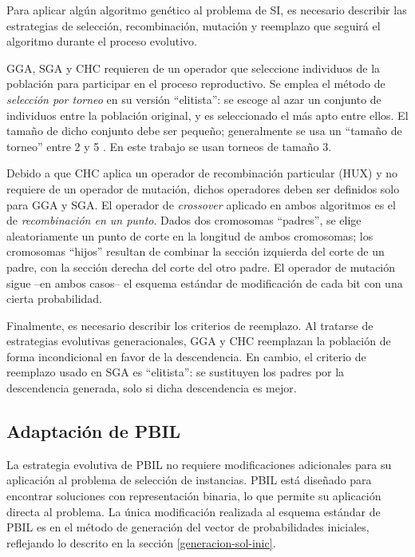 Para aplicar algún algoritmo genético al problema de SI, es necesario describir las estrategias de selección, recombinación, mutación y reemplazo que seguirá el algoritmo durante el proceso evolutivo.

GGA, SGA y CHC requieren de un operador que seleccione individuos de la población para participar en el proceso reproductivo. Se emplea el método de \emph{selección por torneo} en su versión ``elitista'': se escoge al azar un conjunto de individuos entre la población original, y es seleccionado el más apto entre ellos. El tamaño de dicho conjunto debe ser pequeño; generalmente se usa un ``tamaño de torneo'' entre 2 y 5 \cite{Miller95geneticalgorithms}. En este trabajo se usan torneos de tamaño 3.

Debido a que CHC aplica un operador de recombinación particular (HUX) y no requiere de un operador de mutación, dichos operadores deben ser definidos solo para GGA y SGA. El operador de \emph{crossover} aplicado en ambos algoritmos es el de \emph{recombinación en un punto}. Dados dos cromosomas ``padres'', se elige aleatoriamente un punto de corte en la longitud de ambos cromosomas; los cromosomas ``hijos'' resultan de combinar la sección izquierda del corte de un padre, con la sección derecha del corte del otro padre. El operador de mutación sigue --en ambos casos-- el esquema estándar de modificación de cada bit con una cierta probabilidad.

Finalmente, es necesario describir los criterios de reemplazo. Al tratarse de estrategias evolutivas generacionales, GGA y CHC reemplazan la población de forma incondicional en favor de la descendencia. En cambio, el criterio de reemplazo usado en SGA es ``elitista'': se sustituyen los padres por la descendencia generada, solo si dicha descendencia es mejor.

\subsection{Adaptación de PBIL}

La estrategia evolutiva de PBIL no requiere modificaciones adicionales para su aplicación al problema de selección de instancias. PBIL está diseñado para encontrar soluciones con representación binaria, lo que permite su aplicación directa al problema. La única modificación realizada al esquema estándar de PBIL es en el método de generación del vector de probabilidades iniciales, reflejando lo descrito en la sección \ref{generacion-sol-inic}.

